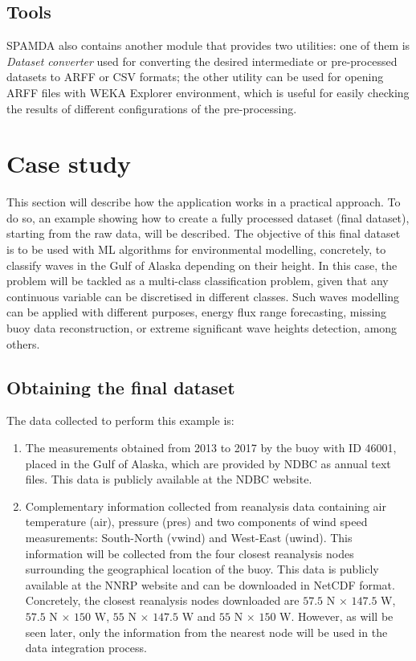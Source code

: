 \documentclass[energies,article,submit,moreauthors,pdftex]{Definitions/mdpi}
\begin{document}
			\subsection{Tools}
			
				SPAMDA also contains another module that provides two utilities: one of them is \textit{Dataset converter} used for converting the desired intermediate or pre-processed datasets to ARFF or CSV formats; the other utility can be used for opening ARFF files with WEKA Explorer environment, which is useful for easily checking the results of different configurations of the pre-processing.
				
	\section{Case study}\label{sec:CaseStudy}
			
		This section will describe how the application works in a practical approach. To do so, an example showing how to create a fully processed dataset (final dataset), starting from the raw data, will be described. The objective of this final dataset is to be used with ML algorithms for environmental modelling, concretely, to classify waves in the Gulf of Alaska depending on their height. In this case, the problem will be tackled as a multi-class classification problem, given that any continuous variable can be discretised in different classes. Such waves modelling can be applied with different purposes, energy flux range forecasting, missing buoy data reconstruction, or extreme significant wave heights detection, among others.
		
		\subsection{Obtaining the final dataset}\label{sec:ObtainingFinalDataset}
		
			The data collected to perform this example is:
			\begin{enumerate}
			\item The measurements obtained from 2013 to 2017 by the buoy with ID 46001, placed in the Gulf of Alaska, which are provided by NDBC as annual text files. This data is publicly available at the NDBC website. 
			\item Complementary information collected from reanalysis data containing air temperature (air), pressure (pres) and two components of wind speed measurements: South-North (vwind) and West-East (uwind). This information will be collected from the four closest reanalysis nodes surrounding the geographical location of the buoy. This data is publicly available at the NNRP website and can be downloaded in NetCDF format. Concretely, the closest reanalysis nodes downloaded are $57.5$ N $\times$ $147.5$ W, $57.5$ N $\times$ $150$ W, $55$ N $\times$ $147.5$ W and $55$ N $\times$ $150$ W. However, as will be seen later, only the information from the nearest node will be used in the data integration process.
			\end{enumerate}
		
\end{document}
